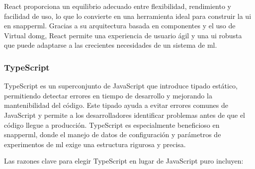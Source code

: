

React proporciona un equilibrio adecuado entre flexibilidad, rendimiento y facilidad de uso, lo que lo convierte en una herramienta ideal para construir la \acrlong{ui} en \Gls{snapperml}. Gracias a su arquitectura basada en componentes y el uso de Virtual \Gls{domg}, React permite una experiencia de usuario ágil y una \acrshort{ui} robusta que puede adaptarse a las crecientes necesidades de un sistema de \acrlong{ml}.

\subsubsection{TypeScript}

TypeScript es un superconjunto de JavaScript que introduce tipado estático, permitiendo detectar errores en tiempo de desarrollo y mejorando la mantenibilidad del código. Este tipado ayuda a evitar errores comunes de JavaScript y permite a los desarrolladores identificar problemas antes de que el código llegue a producción. TypeScript es especialmente beneficioso en \Gls{snapperml}, donde el manejo de datos de configuración y parámetros de experimentos de \acrlong{ml} exige una estructura rigurosa y precisa.

Las razones clave para elegir TypeScript en lugar de JavaScript puro incluyen:

